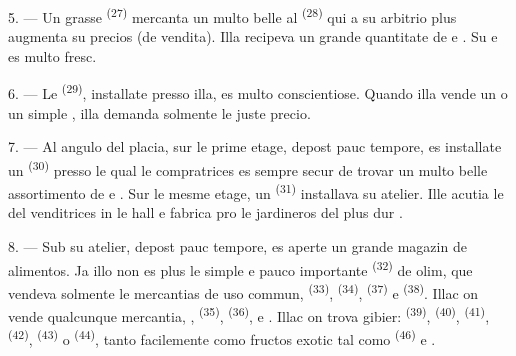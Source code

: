 5. --- Un grasse  \textsuperscript{(27)} mercanta un multo belle
 al  \textsuperscript{(28)} qui a su
arbitrio plus augmenta su precios (de vendita). Illa recipeva un grande quantitate
de  e . Su  e
 es multo fresc.

\VUsaut{4.0mm}
\VUsaut{3.0mm}

6. --- Le  \textsuperscript{(29)}, installate presso
illa, es multo conscientiose. Quando illa vende un  o un simple , illa demanda solmente le juste
precio.

7. --- Al angulo del placia, sur le prime etage, depost pauc tempore, es
installate un  \textsuperscript{(30)} presso le qual
le compratrices es sempre secur de trovar un multo belle assortimento de
 e . Sur le mesme
etage, un  \textsuperscript{(31)} installava su atelier. Ille
acutia le  del venditrices in le hall e fabrica pro le
jardineros  del plus dur .

\VUsaut{4.0mm}
\VUsaut{3.0mm}

8. --- Sub su atelier, depost pauc tempore, es aperte un grande magazin de
alimentos. Ja illo non es plus le simple e pauco importante 
\textsuperscript{(32)} de olim, que vendeva solmente le mercantias de uso commun,
 \textsuperscript{(33)},  \textsuperscript{(34)},
 \textsuperscript{(37)} e 
\textsuperscript{(38)}. Illac on vende qualcunque mercantia, ,  \textsuperscript{(35)}, 
\textsuperscript{(36)},  e
. Illac on trova gibier: 
\textsuperscript{(39)},  \textsuperscript{(40)},
 \textsuperscript{(41)}, 
\textsuperscript{(42)},  \textsuperscript{(43)} o
 \textsuperscript{(44)}, tanto facilemente como fructos exotic
tal como  \textsuperscript{(46)} e .

